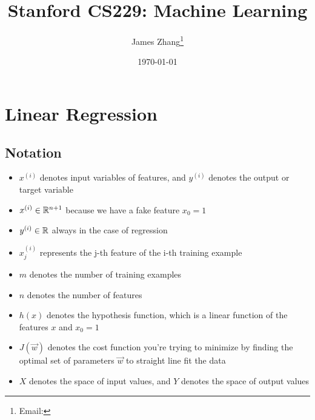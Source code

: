 \documentclass[12pt]{scrartcl}
\begin{document}
\title{Stanford CS229: Machine Learning}
\author{James Zhang\thanks{Email: }}
\date{\today}



\maketitle
\newpage
\tableofcontents
\newpage

\section{Linear Regression}

\subsection{Notation}
\begin{itemize}
    \item $x^{(i)}$ denotes input variables of features, and $y^{(i)}$ denotes the output or target variable
    \item $x^{(i)} \in \mathbb R^{n+1}$ because we have a fake feature $x_0 = 1$
    \item $y^{(i)} \in \mathbb R$ always in the case of regression
    \item $x_j^{(i)}$ represents the j-th feature of the i-th training example
    \item $m$ denotes the number of training examples
    \item $n$ denotes the number of features
    \item $h(x)$ denotes the hypothesis function, which is a linear function of the features $x$ and $x_0 = 1$
    \item $J(\vec{w})$ denotes the cost function you're trying to minimize by finding the optimal set of parameters $\vec{w}$ to straight line fit the data
    \item $X$ denotes the space of input values, and $Y$ denotes the space of output values
\end{itemize}
\end{document}
